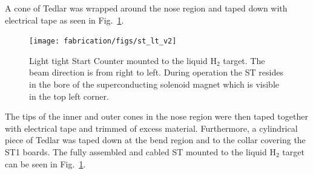 A cone of Tedlar was wrapped around the nose region and taped down with electrical tape as seen in Fig.~\ref{fig:light_tight_st}. 
\begin{figure}[!htb]
	\centering
	\texttt{[image: fabrication/figs/st\_lt\_v2]}
	\caption{Light tight Start Counter mounted to the \gx{} liquid $\mathrm{H_{2}}$ target.  The beam direction is from right to left.  During operation the ST resides in the bore of the superconducting solenoid magnet which is visible in the top left corner.}
	\label{fig:light_tight_st}
\end{figure}
The tips of the inner and outer cones in the nose region were then taped together with electrical tape and trimmed of excess material. Furthermore, a cylindrical piece of Tedlar was taped down at the bend region and to the collar covering the ST1 boards.  The fully assembled and cabled ST mounted to the \gx{} liquid $\mathrm{H_{2}}$ target can be seen in Fig.~\ref{fig:light_tight_st}. 